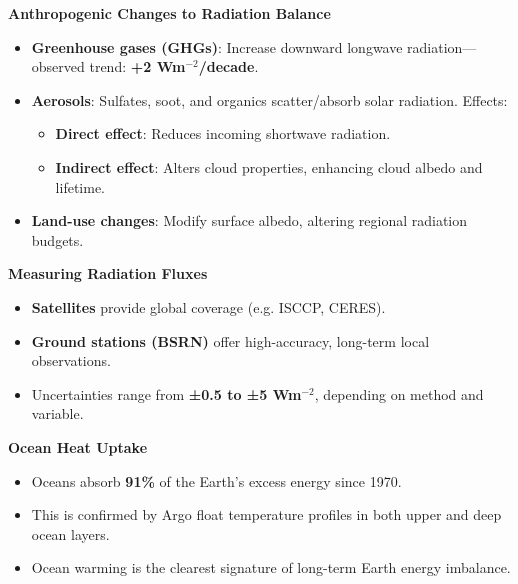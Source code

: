 \documentclass[fontsize=8pt, a4paper, landscape, fleqn]{scrartcl}
\renewcommand{\subsection}[1]{%
    \noindent\colorbox{subsectioncolor}{%
        \parbox{\dimexpr\columnwidth-2\fboxsep}{\color{white}\textbf{#1}}}%
    \vspace{0.5mm}%
}
\begin{document}
\begin{multicols*}{3}[\raggedcolumns]
\subsection{Anthropogenic Changes to Radiation Balance}
\begin{itemize}
    \item \textbf{Greenhouse gases (GHGs)}: Increase downward longwave radiation—observed trend: \textbf{+2 Wm$^{-2}$/decade}.
    \item \textbf{Aerosols}: Sulfates, soot, and organics scatter/absorb solar radiation. Effects:
    \begin{itemize}
        \item \textbf{Direct effect}: Reduces incoming shortwave radiation.
        \item \textbf{Indirect effect}: Alters cloud properties, enhancing cloud albedo and lifetime.
    \end{itemize}
    \item \textbf{Land-use changes}: Modify surface albedo, altering regional radiation budgets.
\end{itemize}

\subsection{Measuring Radiation Fluxes}
\begin{itemize}
    \item \textbf{Satellites} provide global coverage (e.g. ISCCP, CERES).
    \item \textbf{Ground stations (BSRN)} offer high-accuracy, long-term local observations.
    \item Uncertainties range from \textbf{±0.5 to ±5 Wm$^{-2}$}, depending on method and variable.
\end{itemize}

\subsection{Ocean Heat Uptake}
\begin{itemize}
    \item Oceans absorb \textbf{91\%} of the Earth’s excess energy since 1970.
    \item This is confirmed by Argo float temperature profiles in both upper and deep ocean layers.
    \item Ocean warming is the clearest signature of long-term Earth energy imbalance.
\end{itemize}


\end{multicols*}
\end{document}
